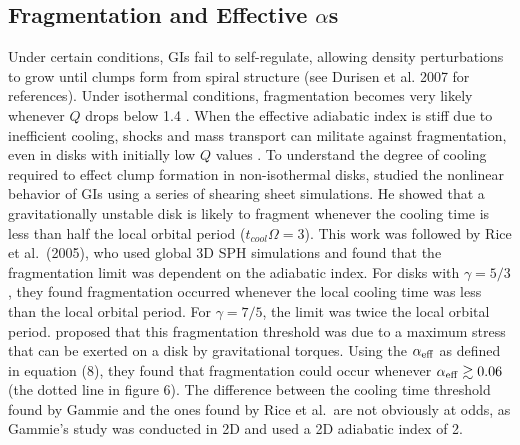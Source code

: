 \documentclass[manuscript]{aastex}
\begin{document}
\subsection{Fragmentation and Effective $\alpha$s}

\noindent

Under certain conditions, GIs fail to self-regulate, allowing density perturbations to grow until clumps form from spiral structure (see Durisen et al. 2007 for references).  Under isothermal conditions, fragmentation becomes very likely whenever $Q$ drops below 1.4 
\citep{tomley1991, tomley1994, nelson1998, mayer2002}. When the effective adiabatic index is stiff due to inefficient
cooling, shocks and mass transport can militate against fragmentation, even in disks with initially low $Q$ values
\citep[e.g., ][]{boley2008}. To understand the degree of cooling required to effect clump formation in non-isothermal
disks, \cite{gammie2001} studied the nonlinear behavior of GIs using a series of shearing sheet simulations.  He showed
that  a gravitationally unstable disk is likely to fragment whenever the cooling time is less than half the local
orbital period ($t_{cool}\Omega = 3$).  This work was followed by Rice et al.~(2005), who used global 3D SPH simulations and found that the fragmentation limit was dependent on the adiabatic index.   For disks with $\gamma=5/3$, they found fragmentation 
occurred whenever the local cooling time was less than the local orbital period. For $\gamma=7/5$, the limit was twice the local orbital period.  \cite{rice2005} proposed that this fragmentation threshold was due to a maximum stress that can  be exerted on a disk by gravitational torques.  Using the $\alpha_{\rm{eff}}$ as defined in equation (8), they found that fragmentation could occur whenever $\alpha_{\rm eff}\gtrsim 0.06$ (the dotted line in figure 6).  The difference between the cooling time threshold found by Gammie and the ones found by Rice et al.~are not obviously at odds, as Gammie's study was conducted in 2D and used a 2D adiabatic index of 2.  
\end{document}
